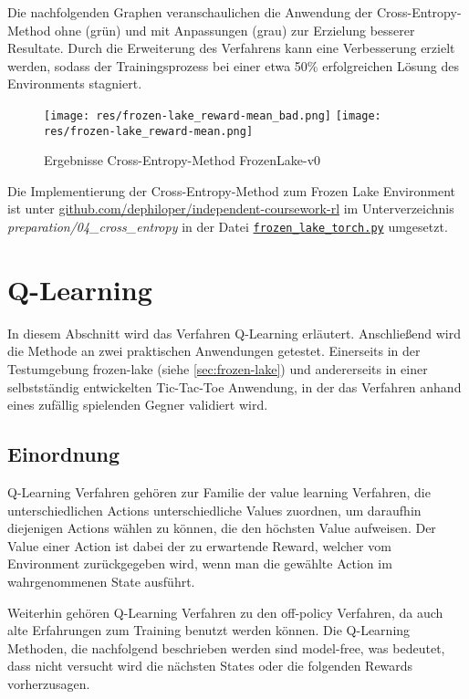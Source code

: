 \documentclass[11pt]{scrartcl}
\begin{document}
Die nachfolgenden Graphen veranschaulichen die Anwendung der Cross-Entropy-Method ohne (grün)
und mit Anpassungen (grau) zur Erzielung besserer Resultate. Durch die Erweiterung des
Verfahrens kann eine Verbesserung erzielt werden, sodass der Trainingsprozess bei einer
etwa 50\% erfolgreichen Lösung des Environments stagniert.

\begin{figure}[htp]
\centering
\texttt{[image: res/frozen-lake\_reward-mean\_bad.png]}
\texttt{[image: res/frozen-lake\_reward-mean.png]}
\caption{Ergebnisse Cross-Entropy-Method FrozenLake-v0}
\label{fig:frozen-lake_cross-entropy}
\end{figure}

Die Implementierung der Cross-Entropy-Method zum Frozen Lake Environment ist unter
\url{github.com/dephiloper/independent-coursework-rl} im Unterverzeichnis 
\textit{preparation/04\_cross\_entropy} in der Datei 
\href{https://github.com/dephiloper/independent-coursework-rl/blob/master/preparation/04_cross_entropy/frozen_lake_torch.py}{\nolinkurl{frozen\_lake\_torch.py}} umgesetzt.
\newpage


\section{Q-Learning}
In diesem Abschnitt wird das Verfahren Q-Learning erläutert. Anschließend wird die Methode
an zwei praktischen Anwendungen getestet. Einerseits in der Testumgebung frozen-lake 
(siehe \autoref{sec:frozen-lake}) und andererseits in einer selbstständig entwickelten
Tic-Tac-Toe Anwendung, in der das Verfahren anhand eines zufällig spielenden Gegner
validiert wird.


\subsection{Einordnung}
Q-Learning Verfahren gehören zur Familie der value learning Verfahren, die
unterschiedlichen Actions unterschiedliche Values zuordnen, um daraufhin diejenigen Actions
wählen zu können, die den höchsten Value aufweisen. Der Value einer Action ist dabei der
zu erwartende Reward, welcher vom Environment zurückgegeben wird, wenn man die gewählte
Action im wahrgenommenen State ausführt.

Weiterhin gehören Q-Learning Verfahren zu den off-policy Verfahren, da auch alte
Erfahrungen zum Training benutzt werden können. Die Q-Learning Methoden, die nachfolgend
beschrieben werden sind model-free, was bedeutet, dass nicht versucht wird die nächsten
States oder die folgenden Rewards vorherzusagen.
\end{document}
